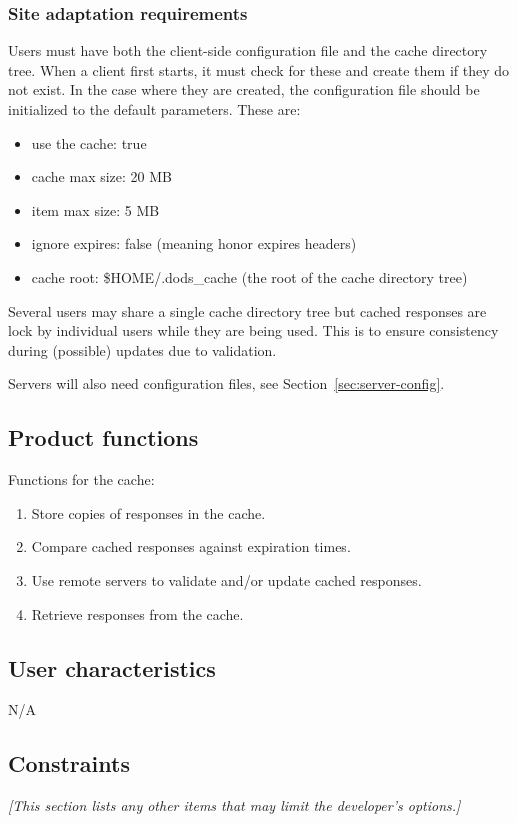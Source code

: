 \documentclass{article}
\begin{document}
\subsubsection{Site adaptation requirements}
Users must have both the client-side configuration file and the cache
directory tree. When a client first starts, it must check for these and
create them if they do not exist. In the case where they are created, the
configuration file should be initialized to the default parameters. These
are:
\begin{itemize}
\item use the cache: true
\item cache max size: 20 MB
\item item max size: 5 MB
\item ignore expires: false (meaning honor expires headers)
\item cache root: \$HOME/.dods\_cache (the root of the cache directory tree)
\end{itemize}

Several users may share a single cache directory tree but cached responses
are lock by individual users while they are being used. This is to ensure
consistency during (possible) updates due to validation.

Servers will also need configuration files, see
Section~\ref{sec:server-config}.

\subsection{Product functions}
Functions for the cache:
\begin{enumerate}
\item Store copies of responses in the cache.
\item Compare cached responses against expiration times.
\item Use remote servers to validate and/or update cached responses.
\item Retrieve responses from the cache.
\end{enumerate}

\subsection{User characteristics}
N/A

\subsection{Constraints}
\emph{[This section lists any other items that may limit the developer's
  options.]}
\end{document}

